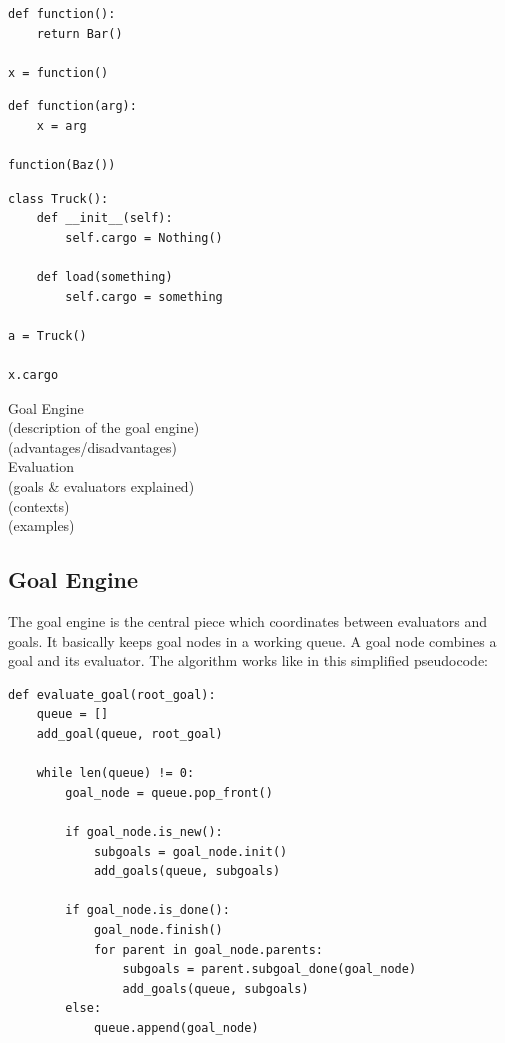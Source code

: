 \documentclass[12pt,halfparskip,DIV11,BCOR10mm]{scrreprt}
\begin{document}
\begin{lstlisting}
def function():
	return Bar()

x = function()
\end{lstlisting}

\begin{lstlisting}
def function(arg):
	x = arg
	
function(Baz())
\end{lstlisting}

\begin{lstlisting}
class Truck():
	def __init__(self):
		self.cargo = Nothing()
	
	def load(something)
		self.cargo = something

a = Truck()

x.cargo 
\end{lstlisting}


Goal Engine \\
 (description of the goal engine)\\
 (advantages/disadvantages)\\
Evaluation\\
 (goals \& evaluators explained)\\
 (contexts)\\
 (examples)


\subsection{Goal Engine}

The goal engine is the central piece which coordinates between evaluators and goals. It basically keeps goal nodes in a working queue. A goal node combines a goal and its evaluator. The algorithm works like in this simplified pseudocode:

\begin{lstlisting}
def evaluate_goal(root_goal):
    queue = []
    add_goal(queue, root_goal)

    while len(queue) != 0:
        goal_node = queue.pop_front()

        if goal_node.is_new():
            subgoals = goal_node.init()
            add_goals(queue, subgoals)

        if goal_node.is_done():
            goal_node.finish()
            for parent in goal_node.parents:
                subgoals = parent.subgoal_done(goal_node)
                add_goals(queue, subgoals)
        else:
            queue.append(goal_node)
\end{lstlisting}
\end{document}
